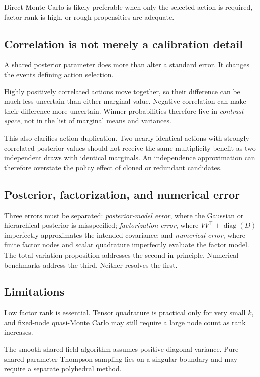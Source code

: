 \documentclass[11pt]{article}
\begin{document}
Direct Monte Carlo is likely preferable when only the selected action is required, factor rank is high, or rough propensities are adequate.

\subsection{Correlation is not merely a calibration detail}

A shared posterior parameter does more than alter a standard error. It changes the events defining action selection.

Highly positively correlated actions move together, so their difference can be much less uncertain than either marginal value. Negative correlation can make their difference more uncertain. Winner probabilities therefore live in \emph{contrast space}, not in the list of marginal means and variances.

This also clarifies action duplication. Two nearly identical actions with strongly correlated posterior values should not receive the same multiplicity benefit as two independent draws with identical marginals. An independence approximation can therefore overstate the policy effect of cloned or redundant candidates.

\subsection{Posterior, factorization, and numerical error}

Three errors must be separated: \emph{posterior-model error}, where the Gaussian or hierarchical posterior is misspecified; \emph{factorization error}, where $V V^\top + \operatorname{diag}(D)$ imperfectly approximates the intended covariance; and \emph{numerical error}, where finite factor nodes and scalar quadrature imperfectly evaluate the factor model. The total-variation proposition addresses the second in principle. Numerical benchmarks address the third. Neither resolves the first.

\subsection{Limitations}

Low factor rank is essential. Tensor quadrature is practical only for very small $k$, and fixed-node quasi-Monte Carlo may still require a large node count as rank increases.

The smooth shared-field algorithm assumes positive diagonal variance. Pure shared-parameter Thompson sampling lies on a singular boundary and may require a separate polyhedral method.
\end{document}
